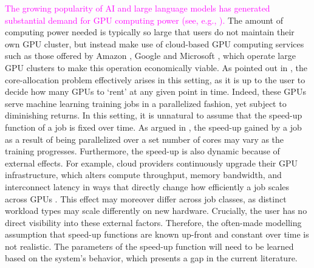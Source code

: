 \documentclass[11pt]{article}
\theoremstyle{remark}
\theoremstyle{definition}
\numberwithin{equation}{section}
\begin{document}
\textcolor{magenta}{The growing popularity of AI and large language models has generated substantial demand for GPU computing power (see, e.g., \cite{mckinsey2026}).}
The amount of computing power needed is typically so large that users do not maintain their own GPU cluster, but instead make use of cloud-based GPU computing services such as those offered by Amazon \cite{amazon2023}, Google \cite{google2024} and Microsoft \cite{microsoft_article}, which operate large GPU clusters to make this operation economically viable. As pointed out in \cite{li2024}, the core-allocation problem effectively arises in this setting, as it is up to the user to decide how many GPUs to `rent' at any given point in time. Indeed, these GPUs serve machine learning training jobs in a parallelized fashion, yet subject to diminishing returns. In this setting, it is unnatural to assume that the speed-up function of a job is fixed over time. As argued in \cite{li2026}, the speed-up gained by a job as a result of being parallelized over a set number of cores may vary as the training progresses. Furthermore, the speed-up is also dynamic because of external effects. For example, cloud providers continuously upgrade their GPU infrastructure, which alters compute throughput, memory bandwidth, and interconnect latency in ways that directly change how efficiently a job scales across GPUs \cite{lym2019, fernandez2024}. This effect may moreover differ across job classes, as distinct workload types may scale differently on new hardware. Crucially, the user has no direct visibility into these external factors. Therefore, the often-made modelling assumption that speed-up functions are known up-front and constant over time is not realistic. The parameters of the speed-up function will need to be learned based on the system's behavior, which presents a gap in the current literature.
\end{document}
